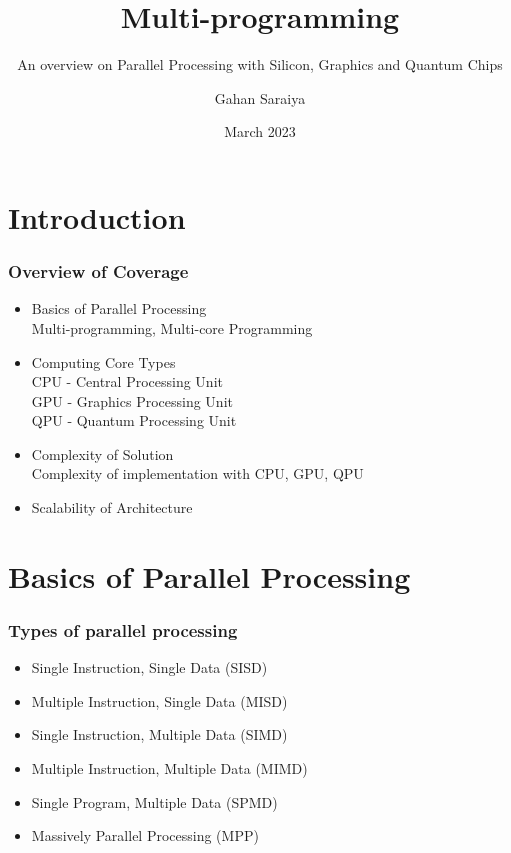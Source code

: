 \documentclass[xcolor=x11names,table]{beamer}
\title{Multi-programming}
\subtitle{An overview on Parallel Processing with Silicon, Graphics and Quantum Chips}
\author{Gahan Saraiya}
\institute{Firmware Development Engineer 
	\\ Intel Technology India Pvt Ltd}
\date{{\scriptsize March 2023}}
\begin{document}
	
	\begin{frame}
		\titlepage
	\end{frame}
	
	
	\section{Introduction}
	
	
	\begin{frame}[allowframebreaks]
		\frametitle{Overview of Coverage}
		\begin{itemize}
			\item Basics of Parallel Processing
			{\scriptsize \\ Multi-programming, Multi-core Programming}
			\item Computing Core Types
				{\scriptsize 
					\\ CPU - Central Processing Unit
					\\ GPU - Graphics Processing Unit
					\\ QPU - Quantum Processing Unit
				}
			\item Complexity of Solution
				{\scriptsize
					\\ Complexity of implementation with CPU, GPU, QPU
				}
			\item Scalability of Architecture
		\end{itemize}
	\end{frame}
	
	\section{Basics of Parallel Processing}
	\begin{frame}
		\frametitle{Types of parallel processing}
		\begin{itemize}
			\item Single Instruction, Single Data (SISD)
			\item Multiple Instruction, Single Data (MISD)
			\item Single Instruction, Multiple Data (SIMD)
			\item Multiple Instruction, Multiple Data (MIMD)
			\item Single Program, Multiple Data (SPMD)
			\item Massively Parallel Processing (MPP)
		\end{itemize}
	\end{frame}
	
\end{document}
